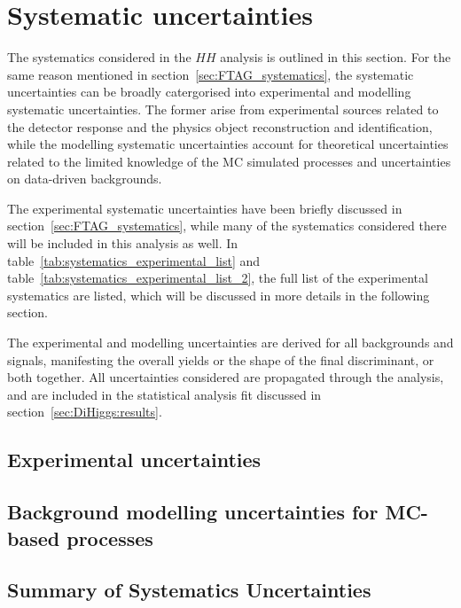 \section{Systematic uncertainties}
The systematics considered in the $HH$ analysis
is outlined in this section. For the same reason 
mentioned in section~\ref{sec:FTAG_systematics}, 
the systematic uncertainties can be broadly catergorised
into experimental and modelling systematic uncertainties. 
The former arise from experimental sources related to the detector 
response and the physics object reconstruction and identification,
while the modelling systematic uncertainties account for 
theoretical uncertainties related to the limited 
knowledge of the MC simulated processes 
and uncertainties on data-driven backgrounds. 

The experimental systematic uncertainties have been 
briefly discussed in section~\ref{sec:FTAG_systematics},
while many of the systematics considered there will
be included in this analysis as well. 
In table~\ref{tab:systematics_experimental_list} 
and table~\ref{tab:systematics_experimental_list_2}, the full list
of the experimental systematics are listed, 
which will be discussed in more details in the following section.  

The experimental and modelling uncertainties are derived for 
all backgrounds and signals, manifesting the overall yields
or the shape of the final discriminant, or both together.
All uncertainties considered are propagated through the analysis,
and are included in the statistical analysis fit
discussed in section~\ref{sec:DiHiggs:results}.


\subsection{Experimental uncertainties}
\label{sec:systematics_experimental}





\subsection{Background modelling uncertainties for MC-based processes}
\label{sec:systematics_backgroundmodelling}




\subsection{Summary of Systematics Uncertainties}

